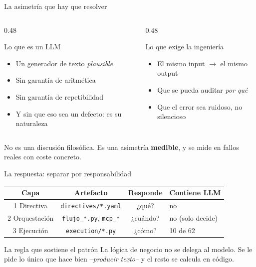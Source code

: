 \documentclass[aspectratio=169,11pt]{beamer}
\begin{document}
\begin{frame}{La asimetría que hay que resolver}
  \begin{columns}[T]
    \begin{column}{0.48\textwidth}
      \begin{alertblock}{Lo que es un LLM}
        \begin{itemize}
          \item Un generador de texto \emph{plausible}
          \item Sin garantía de aritmética
          \item Sin garantía de repetibilidad
          \item Y sin que eso sea un defecto: es su naturaleza
        \end{itemize}
      \end{alertblock}
    \end{column}
    \begin{column}{0.48\textwidth}
      \begin{exampleblock}{Lo que exige la ingeniería}
        \begin{itemize}
          \item El mismo input $\rightarrow$ el mismo output
          \item Que se pueda auditar \emph{por qué}
          \item Que el error sea ruidoso, no silencioso
        \end{itemize}
      \end{exampleblock}
    \end{column}
  \end{columns}
  \smallskip
  \begin{panelRegla}
    No es una discusión filosófica. Es una asimetría \textbf{medible}, y se mide
    en fallos reales con coste concreto.
  \end{panelRegla}
\end{frame}

\begin{frame}{La respuesta: separar por responsabilidad}
  \begin{center}
  \begin{tabular}{@{}c c c l@{}}
    \toprule
    \textbf{Capa} & \textbf{Artefacto} & \textbf{Responde} & \textbf{Contiene LLM} \\
    \midrule
    1 \quad Directiva & \texttt{directives/*.yaml} & ¿qué? & no \\
    2 \quad Orquestación & \texttt{flujo\_*.py}, \texttt{mcp\_*} & ¿cuándo? & no (solo decide) \\
    3 \quad Ejecución & \texttt{execution/*.py} & ¿cómo? & 10 de 62 \\
    \bottomrule
  \end{tabular}
  \end{center}
  \smallskip
  \begin{block}{La regla que sostiene el patrón}
    La lógica de negocio no se delega al modelo. Se le pide lo único que hace
    bien --\emph{producir texto--} y el resto se calcula en código.
  \end{block}
\end{frame}
\end{document}
